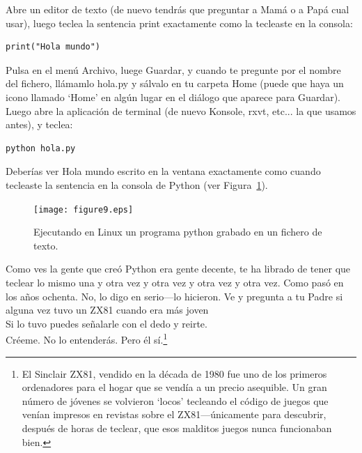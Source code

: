 \begin{LINUX}
Abre un editor de texto (de nuevo tendrás que preguntar a Mamá o a Papá cual usar), luego teclea la sentencia print exactamente como la tecleaste en la consola:

\begin{listing}
\begin{verbatim}
print("Hola mundo")
\end{verbatim}
\end{listing}

Pulsa en el menú Archivo, luege Guardar, y cuando te pregunte por el nombre del fichero, llámamlo hola.py y sálvalo en tu carpeta Home (puede que haya un icono llamado `Home' en algún lugar en el diálogo que aparece para Guardar). Luego abre la aplicación de terminal (de nuevo Konsole, rxvt, etc... la que usamos antes), y teclea:

\begin{listing}
\begin{verbatim}
python hola.py
\end{verbatim}
\end{listing}

Deberías ver Hola mundo escrito en la ventana exactamente como cuando tecleaste la sentencia en la consola de Python (ver Figura~\ref{fig9}).

\begin{figure}
\begin{center}
\texttt{[image: figure9.eps]}
\end{center}
\caption{Ejecutando en Linux un programa python grabado en un fichero de texto.}\label{fig9}
\end{figure}
\end{LINUX}

Como ves la gente que creó Python era gente decente, te ha librado de tener que teclear lo mismo una y otra vez y otra vez y otra vez y otra vez. Como pasó en los años ochenta. No, lo digo en serio---lo hicieron. Ve y pregunta a tu Padre si alguna vez tuvo un ZX81 cuando era más joven\\

\noindent
Si lo tuvo puedes señalarle con el dedo y reirte.\\

\noindent
Créeme. No lo entenderás. Pero él sí.\footnote{El Sinclair ZX81, vendido en la década de 1980 fue uno de los primeros ordenadores para el hogar que se vendía a un precio asequible. Un gran número de jóvenes se volvieron `locos' tecleando el código de juegos que venían impresos en revistas sobre el ZX81---únicamente para descubrir, después de horas de teclear, que esos malditos juegos nunca funcionaban bien.}

